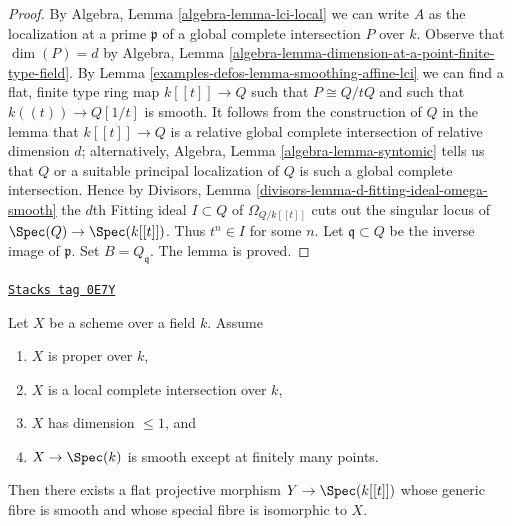 \begin{proof}
By Algebra, Lemma \ref{algebra-lemma-lci-local} we can write $A$ as the
localization at a prime $\mathfrak p$ of a global complete intersection $P$
over $k$. Observe that $\dim(P) = d$ by
Algebra, Lemma \ref{algebra-lemma-dimension-at-a-point-finite-type-field}.
By Lemma \ref{examples-defos-lemma-smoothing-affine-lci} we can find a
flat, finite type ring map $k[[t]] \to Q$ such that $P \cong Q/tQ$ and
such that $k((t)) \to Q[1/t]$ is smooth. It follows from the construction
of $Q$ in the lemma that $k[[t]] \to Q$ is a relative global
complete intersection of relative dimension $d$; alternatively,
Algebra, Lemma \ref{algebra-lemma-syntomic} tells us that $Q$ or a
suitable principal localization of $Q$ is such a global complete intersection.
Hence by Divisors, Lemma \ref{divisors-lemma-d-fitting-ideal-omega-smooth}
the $d$th Fitting ideal $I \subset Q$ of $\Omega_{Q/k[[t]]}$
cuts out the singular locus of $\Spec(Q) \to \Spec(k[[t]])$.
Thus $t^n \in I$ for some $n$.
Let $\mathfrak q \subset Q$
be the inverse image of $\mathfrak p$. Set $B = Q_\mathfrak q$.
The lemma is proved.
\end{proof}

\begin{lemma}
\label{examples-defos-lemma-smoothing-proper-curve-isolated-lci}
\href{https://stacks.math.columbia.edu/tag/0E7Y}{\texttt{Stacks tag 0E7Y}}

Let $X$ be a scheme over a field $k$. Assume
\begin{enumerate}
\item $X$ is proper over $k$,
\item $X$ is a local complete intersection over $k$,
\item $X$ has dimension $\leq 1$, and
\item $X \to \Spec(k)$ is smooth except at finitely many points.
\end{enumerate}
Then there exists a flat projective morphism $Y \to \Spec(k[[t]])$
whose generic fibre is smooth and whose special fibre is
isomorphic to $X$.
\end{lemma}

